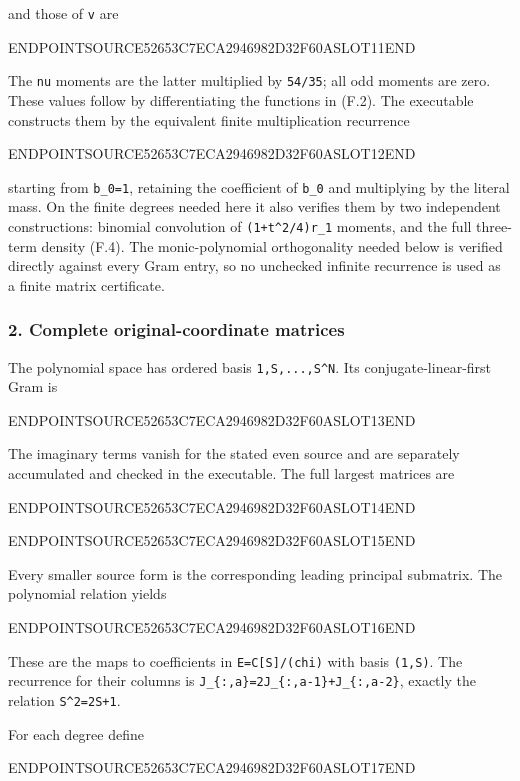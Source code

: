 and those of \texttt{v} are

ENDPOINTSOURCE52653C7ECA2946982D32F60ASLOT11END

The \texttt{nu} moments are the latter multiplied by \texttt{54/35}; all odd moments are zero. These values follow by differentiating the functions in (F.2). The executable constructs them by the equivalent finite multiplication recurrence

ENDPOINTSOURCE52653C7ECA2946982D32F60ASLOT12END

starting from \texttt{b\_0=1}, retaining the coefficient of \texttt{b\_0} and multiplying by the literal mass. On the finite degrees needed here it also verifies them by two independent constructions: binomial convolution of \texttt{(1+t\^{}2/4)r\_1} moments, and the full three-term density (F.4). The monic-polynomial orthogonality needed below is verified directly against every Gram entry, so no unchecked infinite recurrence is used as a finite matrix certificate.

\subsubsection{2. Complete original-coordinate matrices}\label{endpoint-restriction_fixture--complete-original-coordinate-matrices}

The polynomial space has ordered basis \texttt{1,S,...,S\^{}N}. Its conjugate-linear-first Gram is

ENDPOINTSOURCE52653C7ECA2946982D32F60ASLOT13END

The imaginary terms vanish for the stated even source and are separately accumulated and checked in the executable. The full largest matrices are

ENDPOINTSOURCE52653C7ECA2946982D32F60ASLOT14END

ENDPOINTSOURCE52653C7ECA2946982D32F60ASLOT15END

Every smaller source form is the corresponding leading principal submatrix. The polynomial relation yields

ENDPOINTSOURCE52653C7ECA2946982D32F60ASLOT16END

These are the maps to coefficients in \texttt{E=C{[}S{]}/(chi)} with basis \texttt{(1,S)}. The recurrence for their columns is \texttt{J\_\{:,a\}=2J\_\{:,a-1\}+J\_\{:,a-2\}}, exactly the relation \texttt{S\^{}2=2S+1}.

For each degree define

ENDPOINTSOURCE52653C7ECA2946982D32F60ASLOT17END

